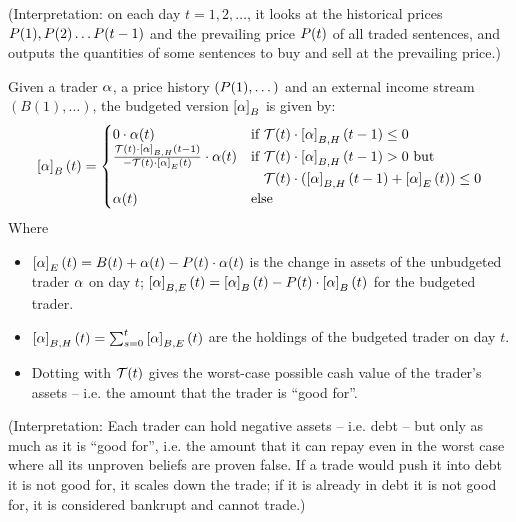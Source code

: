 (Interpretation: on each day $t = 1, 2, \dots$, it looks at the historical prices $P(1), P(2) \dots P(t-1)$ and the prevailing price $P(t)$ of all traded sentences, and outputs the quantities of some sentences to buy and sell at the prevailing price.)

\begin{definition}\label{def:budget}
    Given a trader $\alpha$, a price history $(P(1), \dots)$ and an external income stream $(B(1),\dots)$, the budgeted version $\prop[B]{\agent}$ is given by:
    \begin{equation*}
        \prop[B]{\agent}(t)=
        \begin{cases}
            0 \cdot \agent(t) & \text{if }
            \Theorems(t)\cdot\prop[B,H]{\agent}(t-1) \le 0 \\

            \frac{\Theorems(t)\cdot\prop[B,H]{\agent}(t-1)}{-\Theorems(t)\cdot\prop[E]{\agent}(t)}\cdot\agent(t)
            & \text{if } 
             \begin{aligned}[t]
             & \Theorems(t)\cdot\prop[B,H]{\agent}(t-1) > 0 \text{ but } \\
             & \Theorems(t)\cdot(\prop[B,H]{\agent}(t-1) + \prop[E]{\agent}(t)) \le 0
             \end{aligned} 
             \\
            \agent(t) & \text{else} \\
        \end{cases}
    \end{equation*}
    Where
    \begin{itemize}
        \item $\prop[E]{\agent}(t) = B(t)+\agent(t)-\Price(t)\cdot\agent(t)$ is the change in assets of the unbudgeted trader $\alpha$ on day $t$; $\prop[B,E]{\agent}(t) = \prop[B]{\agent}(t)-\Price(t)\cdot\prop[B]{\agent}(t)$ for the budgeted trader.
        \item $\prop[B,H]{\agent}(t)=\sum_{s=0}^{t}{\prop[B,E]{\agent}(t)}$ are the holdings of the budgeted trader on day $t$.
        \item Dotting with $\mathcal{T}(t)$ gives the worst-case possible cash value of the trader's assets -- i.e. the amount that the trader is ``good for''.
    \end{itemize}
\end{definition}

(Interpretation: Each trader can hold negative assets -- i.e. debt -- but only as much as it is ``good for'', i.e. the amount that it can repay even in the worst case where all its unproven beliefs are proven false. If a trade would push it into debt it is not good for, it scales down the trade; if it is already in debt it is not good for, it is considered bankrupt and cannot trade.)

